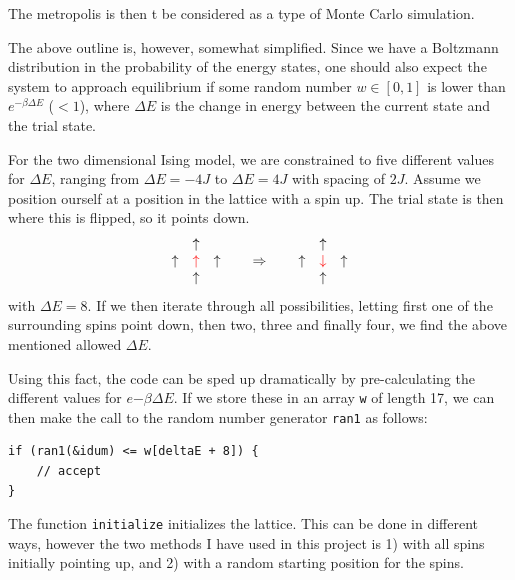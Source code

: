 \documentclass[twoside, 11pt]{article}
\begin{document}
		The metropolis is then t be considered as a type of Monte Carlo simulation.
		
		The above outline is, however, somewhat simplified. Since we have a Boltzmann distribution in the probability of the energy states, one should also expect the system to approach equilibrium if some random number $w\in[0,1]$ is lower than $e^{-\beta\Delta E}$ ($<1$), where $\Delta E$ is the change in energy between the current state and the trial state. 
		
		For the two dimensional Ising model, we are constrained to five different values for $\Delta E$, ranging from $\Delta E = -4J$ to $\Delta E = 4J$ with spacing of $2J$. Assume we position ourself at a position in the lattice with a spin up. The trial state is then where this is flipped, so it points down.
		\begin{align*}
			\begin{matrix}
								& \uparrow 						& 					\\ 
				\uparrow 	& {\color{red}\uparrow} & \uparrow 	\\ 
								& \uparrow 						&
			\end{matrix} 
			\qquad \Rightarrow \qquad
			\begin{matrix}
								& \uparrow 						& 					\\ 
				\uparrow 	& {\color{red}\downarrow} & \uparrow 	\\ 
								& \uparrow 						&
			\end{matrix} 
		\end{align*}
		with $\Delta E = 8$. If we then iterate through all possibilities, letting first one of the surrounding spins point down, then two, three and finally four, we find the above mentioned allowed $\Delta E$. 
		
		Using this fact, the code can be sped up dramatically by pre-calculating the different values for $e{-\beta \Delta E}$. If we store these in an array \texttt{w} of length 17, we can then make the call to the random number generator \texttt{ran1} as follows:
		\begin{lstlisting}
if (ran1(&idum) <= w[deltaE + 8]) {
	// accept
}
		\end{lstlisting}
			
		The function \texttt{initialize} initializes the lattice. This can be done in different ways, however the two methods I have used in this project is 1) with all spins initially pointing up, and 2) with a random starting position for the spins.
		
\end{document}
